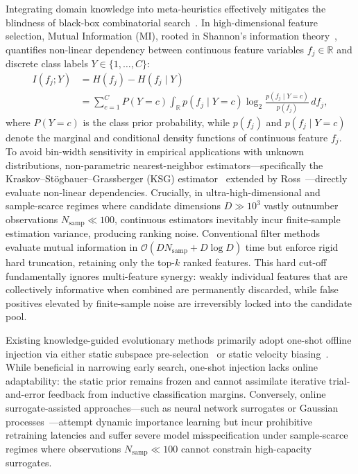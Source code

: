 Integrating domain knowledge into meta-heuristics effectively mitigates the blindness of black-box combinatorial search~\cite{ye2026,mimpode2025,deng2025nns}. In high-dimensional feature selection, Mutual Information (MI), rooted in Shannon's information theory~\cite{cover1991}, quantifies non-linear dependency between continuous feature variables $f_j \in \mathbb{R}$ and discrete class labels $Y \in \{1, \dots, C\}$:
\begin{equation}
\begin{aligned}
I(f_j; Y) &= H(f_j) - H(f_j \mid Y) \\
&= \sum_{c=1}^C P(Y = c) \int_{\mathbb{R}} p(f_j \mid Y = c) \log_2 \frac{p(f_j \mid Y = c)}{p(f_j)} \, df_j,
\end{aligned}
\label{eq:mi}
\end{equation}
where $P(Y = c)$ is the class prior probability, while $p(f_j)$ and $p(f_j \mid Y = c)$ denote the marginal and conditional density functions of continuous feature $f_j$. To avoid bin-width sensitivity in empirical applications with unknown distributions, non-parametric nearest-neighbor estimators---specifically the Kraskov--St{\"o}gbauer--Grassberger (KSG) estimator~\cite{kraskov2004} extended by Ross~\cite{ross2014}---directly evaluate non-linear dependencies. Crucially, in ultra-high-dimensional and sample-scarce regimes where candidate dimensions $D \gg 10^3$ vastly outnumber observations $N_{\mathrm{samp}} \ll 100$, continuous estimators inevitably incur finite-sample estimation variance, producing ranking noise. Conventional filter methods~\cite{peng2005,deng2025nns} evaluate mutual information in $\mathcal{O}(D N_{\mathrm{samp}} + D \log D)$ time but enforce rigid hard truncation, retaining only the top-$k$ ranked features. This hard cut-off fundamentally ignores multi-feature synergy: weakly individual features that are collectively informative when combined are permanently discarded, while false positives elevated by finite-sample noise are irreversibly locked into the candidate pool.

Existing knowledge-guided evolutionary methods primarily adopt one-shot offline injection via either static subspace pre-selection~\cite{mimpode2025,deng2025nns} or static velocity biasing~\cite{wangjia2022}. While beneficial in narrowing early search, one-shot injection lacks online adaptability: the static prior remains frozen and cannot assimilate iterative trial-and-error feedback from inductive classification margins. Conversely, online surrogate-assisted approaches---such as neural network surrogates or Gaussian processes~\cite{liu2024}---attempt dynamic importance learning but incur prohibitive retraining latencies and suffer severe model misspecification under sample-scarce regimes where observations $N_{\mathrm{samp}} \ll 100$ cannot constrain high-capacity surrogates.

